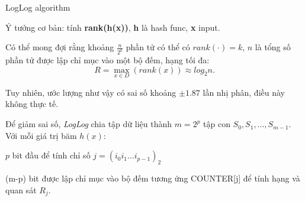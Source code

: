 \documentclass[10pt]{beamer}
\newcommand{\SubItem}[1]{
    {\setlength\itemindent{15pt} \item[-] #1}
}
\begin{document}
\begin{frame}{LogLog algorithm}
\begin{itemize}
	\item Ý tưởng cơ bản: tính \textbf{rank(h(x))}, \textbf{h} là hash func, \textbf{x} input.
	\item Có thể mong đợi rằng khoảng $\frac{n}{2^k}$ phần tử có thể có $rank(\cdot) = k$, $n$ là tổng số phần tử được lập chỉ mục vào một bộ đếm, hạng tối đa:
  \[R = \underset{x \in D}{\max}\left(rank(x)\right) \approx log_2n.\]
  \item Tuy nhiên, ước lượng như vậy có sai số khoảng $\pm1.87$ lần nhị phân, điều này 
  không thực tế. 
  \item Để giảm sai số, \textit{LogLog} chia tập dữ liệu thành $m = 2^p$ tập con $S_0, S_1,..., S_{m-1}$. Với mỗi giá trị băm $h(x)$:
	\SubItem{$p$ bit đầu để tính chỉ số $j = \left(i_0i_1...i_{p-1}\right)_2$} 
  	\SubItem{(m-p) bit được lập chỉ mục vào bộ đếm tương ứng COUNTER[j] để tính hạng và quan sát $R_j$.}
\end{itemize}

\end{frame}
\end{document}
